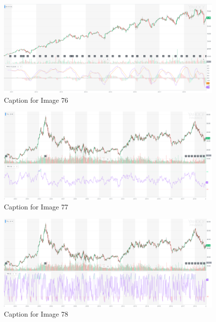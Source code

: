 \documentclass{article}
\begin{document}
\vspace{10pt}

\begin{figure}[!htb]
    \centering
    \includegraphics[width=\textwidth]{imgs/76.png}
    \caption{Caption for Image 76}
\end{figure}

\vspace{10pt}

\begin{figure}[!htb]
    \centering
    \includegraphics[width=\textwidth]{imgs/77.png}
    \caption{Caption for Image 77}
\end{figure}

\vspace{10pt}

\begin{figure}[!htb]
    \centering
    \includegraphics[width=\textwidth]{imgs/78.png}
    \caption{Caption for Image 78}
\end{figure}
\end{document}
